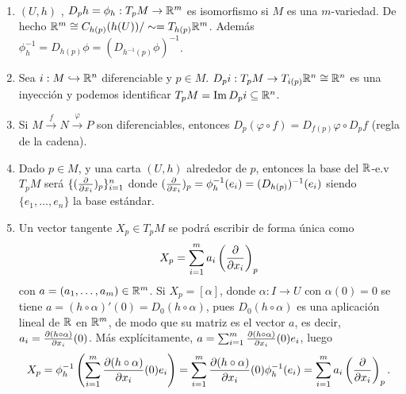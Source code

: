 \documentclass[CV.tex]{subfiles}
\begin{document}
\begin{nota}\
\begin{enumerate}
\item $(U,h)$ , $D_ph=\phi_h:T_pM\to\mathbb{R}^m$ es isomorfismo si $M$ es una $m$-variedad. De hecho $\mathbb{R}^m\cong C_{h(p)}(h(U))/\sim =T_{h(p)}\mathbb{R}^m$. Además $\phi^{-1}_h=D_{h(p)}\phi=(D_{h^{-1}(p)}\phi)^{-1}$.
\item Sea $i:M\hookrightarrow \mathbb{R}^n$ diferenciable y $p\in M$. $D_pi:T_pM\to T_{i(p)}\mathbb{R}^n\cong\mathbb{R}^n$ es una inyección y podemos identificar $T_pM=\operatorname{Im} D_pi\subseteq\mathbb{R}^n$. 
\item Si $M\overset{f}{\to}N\overset{\varphi}{\to}P$ son diferenciables, entonces $D_p(\varphi\circ f)=D_{f(p)}\varphi\circ D_pf$ (regla de la cadena).
\item Dado $p\in M$, y una carta $(U,h)$ alrededor de $p$, entonces la base del $\mathbb{R}$-e.v $T_pM$ será $\{(\frac{\partial }{\partial x_i})_p\}_{i=1
}^n$ donde $(\frac{\partial }{\partial x_i})_p=\phi^{-1}_h(e_i)=(D_{h(p)})^{-1}(e_i)$ siendo $\{e_1,\dots, e_n\}$ la base estándar.
\item Un vector tangente $X_p\in T_pM$ se podrá escribir de forma única como
\begin{equation}\label{coord}
X_p=\sum_{i=1}^m a_i\left(\frac{\partial }{\partial x_i}\right)_p
\end{equation}
con $a=(a_1,\dots, a_m)\in\mathbb{R}^m$. Si $X_p=[\alpha]$, donde $\alpha:I\to U$ con $\alpha(0)=0$ se tiene $a=(h\circ \alpha)'(0)=D_0(h\circ\alpha)$, pues $D_0(h\circ\alpha)$ es una aplicación lineal de $\mathbb{R}$ en $\mathbb{R}^m$, de modo que su matriz es el vector $a$, es decir, $a_i=\frac{\partial (h\circ\alpha)}{\partial x_i}(0)$. Más explícitamente, $a=\sum_{i=1}^m \frac{\partial (h\circ\alpha)}{\partial x_i}(0)e_i$, luego 
\[
X_p=\phi_h^{-1}\left(\sum_{i=1}^m \frac{\partial (h\circ\alpha)}{\partial x_i}(0)e_i \right)=\sum_{i=1}^m \frac{\partial (h\circ\alpha)}{\partial x_i}(0)\phi_h^{-1}(e_i)=\sum_{i=1}^m a_i\left(\frac{\partial }{\partial x_i}\right)_p.
\]


\end{enumerate}
\end{nota}
\end{document}
